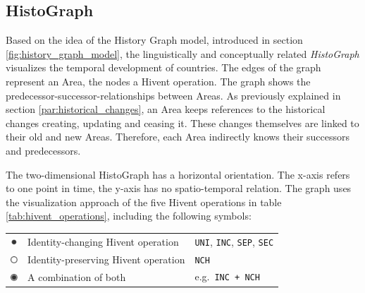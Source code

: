 
\subsection{HistoGraph} %
\label{sub:histograph}

Based on the idea of the History Graph model, introduced in section \ref{fig:history_graph_model}, the linguistically and conceptually related \emph{HistoGraph} visualizes the temporal development of countries. The edges of the graph represent an Area, the nodes a Hivent operation. The graph shows the predecessor-successor-relationships between Areas. As previously explained in section \ref{par:historical_changes}, an Area keeps references to the historical changes creating, updating and ceasing it. These changes themselves are linked to their old and new Areas. Therefore, each Area indirectly knows their successors and predecessors.

The two-dimensional HistoGraph has a horizontal orientation. The x-axis refers to one point in time, the y-axis has no spatio-temporal relation. The graph uses the visualization approach of the five Hivent operations in table \ref{tab:hivent_operations}, including the following symbols:

\begin{table}[H]
\begin{center}
\begin{tabular}{c l l}

  \raisebox{3.5\height}

  \raisebox{-0.2\height}
  {\includegraphics[width=10px]{graphics/development/hivent_model/histograph/circle_filled}}
  & Identity-changing Hivent operation
  & \texttt{UNI}, \texttt{INC}, \texttt{SEP}, \texttt{SEC} \\

  \raisebox{-0.2\height}
  {\includegraphics[width=10px]{graphics/development/hivent_model/histograph/circle_unfilled}}
  & Identity-preserving Hivent operation
  & \texttt{NCH} \\

  \raisebox{-0.2\height}
  {\includegraphics[width=10px]{graphics/development/hivent_model/histograph/circle_combo}}
  & A combination of both
  & e.g.\ \texttt{INC + NCH}

\end{tabular}
\label{tab:histograph_symbols}
\end{center}
\end{table}

